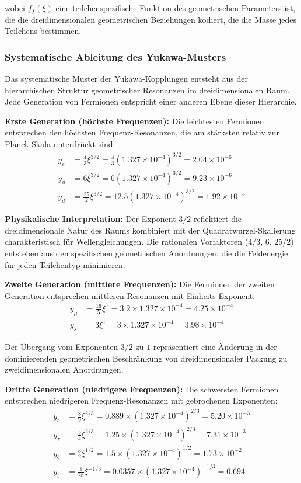 \documentclass[12pt,a4paper]{article}
\newcommand{\xigeom}{\xi}
\begin{document}
	wobei $f_f(\xigeom)$ eine teilchenspezifische Funktion des geometrischen Parameters ist, die die dreidimensionalen geometrischen Beziehungen kodiert, die die Masse jedes Teilchens bestimmen.
	
	\subsubsection{Systematische Ableitung des Yukawa-Musters}
	
	Das systematische Muster der Yukawa-Kopplungen entsteht aus der hierarchischen Struktur geometrischer Resonanzen im dreidimensionalen Raum. Jede Generation von Fermionen entspricht einer anderen Ebene dieser Hierarchie.
	
	\textbf{Erste Generation (höchste Frequenzen):} Die leichtesten Fermionen entsprechen den höchsten Frequenz-Resonanzen, die am stärksten relativ zur Planck-Skala unterdrückt sind:
	\begin{align}
		y_e &= \frac{4}{3} \xigeom^{3/2} = \frac{4}{3} (1.327 \times 10^{-4})^{3/2} = 2.04 \times 10^{-6} \\
		y_u &= 6 \xigeom^{3/2} = 6 (1.327 \times 10^{-4})^{3/2} = 9.23 \times 10^{-6} \\
		y_d &= \frac{25}{2} \xigeom^{3/2} = 12.5 (1.327 \times 10^{-4})^{3/2} = 1.92 \times 10^{-5}
	\end{align}
	
	\textbf{Physikalische Interpretation:} Der Exponent $3/2$ reflektiert die dreidimensionale Natur des Raums kombiniert mit der Quadratwurzel-Skalierung charakteristisch für Wellengleichungen. Die rationalen Vorfaktoren (4/3, 6, 25/2) entstehen aus den spezifischen geometrischen Anordnungen, die die Feldenergie für jeden Teilchentyp minimieren.
	
	\textbf{Zweite Generation (mittlere Frequenzen):} Die Fermionen der zweiten Generation entsprechen mittleren Resonanzen mit Einheits-Exponent:
	\begin{align}
		y_\mu &= \frac{16}{5} \xigeom^1 = 3.2 \times 1.327 \times 10^{-4} = 4.25 \times 10^{-4} \\
		y_s &= 3 \xigeom^1 = 3 \times 1.327 \times 10^{-4} = 3.98 \times 10^{-4}
	\end{align}
	
	Der Übergang vom Exponenten $3/2$ zu $1$ repräsentiert eine Änderung in der dominierenden geometrischen Beschränkung von dreidimensionaler Packung zu zweidimensionalen Anordnungen.
	
	\textbf{Dritte Generation (niedrigere Frequenzen):} Die schwersten Fermionen entsprechen niedrigeren Frequenz-Resonanzen mit gebrochenen Exponenten:
	\begin{align}
		y_c &= \frac{8}{9} \xigeom^{2/3} = 0.889 \times (1.327 \times 10^{-4})^{2/3} = 5.20 \times 10^{-3} \\
		y_\tau &= \frac{5}{4} \xigeom^{2/3} = 1.25 \times (1.327 \times 10^{-4})^{2/3} = 7.31 \times 10^{-3} \\
		y_b &= \frac{3}{2} \xigeom^{1/2} = 1.5 \times (1.327 \times 10^{-4})^{1/2} = 1.73 \times 10^{-2} \\
		y_t &= \frac{1}{28} \xigeom^{-1/3} = 0.0357 \times (1.327 \times 10^{-4})^{-1/3} = 0.694
	\end{align}
	
\end{document}
